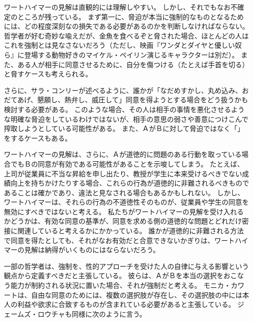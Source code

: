 \documentclass[paper=a4,book,openany]{jlreq}
\newcommand{\ig}[1]{}           %
\begin{document}
ワートハイマーの見解は直観的には理解しやすい。
しかし、それでもなお不確定のところが残っている。
まず第一に、脅迫が本当に強制的なものとなるためには、どの程度深刻なの損失である必要があるのかを判断しなければならない。
哲学者が好む奇妙な喩えだが、金魚を食べるぞと脅された場合、ほとんどの人はこれを強制とは見なさないだろう（ただし、映画『ワンダとダイヤと優しい奴ら』に登場する動物好きのマイケル・ペイリン演じるキャラクターは別だ）。
また、ある人が相手に同意させるために、自分を傷つける（たとえば手首を切る）と脅すケースも考えられる\citep[p.280]{husak06:_compl_guide_consen_sex}。

さらに、サラ・コンリーが述べるように、誰かが「なだめすかし、丸め込み、おだてあげ、懇願し、熱弁し、威圧して」同意を得ようとする場合をどう扱うかも検討する必要がある\citep[p.115]{conly04:seductionrapecoercion}。
このような場合、その人は相手の事情を悪化させるような明確な脅迫をしているわけではないが、相手の意思の弱さや善意につけこんで搾取しようとしている可能性がある。
また、ＡがＢに対して脅迫ではなく「」をするケースもある。

ワートハイマーの見解は、さらに、Ａが道徳的に問題のある行動を取っている場合でもＢの同意が有効である可能性があることを示唆してしまう。
たとえば、上司が従業員に不当な昇給を申し出たり、教授が学生に本来受けるべきでない成績向上を持ちかけたりする場合、これらの行為が道徳的に非難されるべきものであることは確かであり、違法と見なされる場合もあるかもしれない。
しかし、ワートハイマーは、それらの行為の不道徳性そのものが、従業員や学生の同意を無効にすべきではないと考える。
私たちがワートハイマーの見解を受け入れるかどうかは、有効な同意の基準が、同意を求める側の道徳的な問題とどれだけ密接に関連していると考えるかにかかっている。
誰かが道徳的に非難される方法で同意を得たとしても、それがなお有効だと合意できないかぎりは、ワートハイマーの見解は納得がいくものにはならないだろう。

一部の哲学者は、強制を、性的アプローチを受けた人の自律に与える影響という観点から定義すべきだと主張している。
彼らは、ＡがＢを本当の選択をおこなう能力が制約される状況に置いた場合、それが強制だと考える。
モニカ・カワート\ig{Monica Cowart}は、自由な同意のためには、複数の選択肢が存在し、その選択肢の中には本人の利益や欲求に合致するものが含まれている必要があると主張している\citep{cowart04:_under_acts_consen}。
ジェームズ・ロウチャ\ig{James Rocha}も同様に次のように言う。
\end{document}
